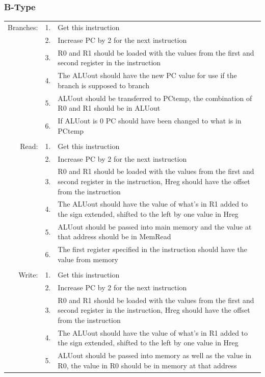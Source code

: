 \documentclass{article}
\begin{document}
		\subsubsection{B-Type}
			\begin{tabular}{ r  r  p{13cm} }
					Branches: & 1. & Get this instruction\\
					          & 2. & Increase PC by 2 for the next instruction\\
					          & 3. & R0 and R1 should be loaded with the values from the first and second register in the instruction\\
					          & 4. & The ALUout should have the new PC value for use if the branch is supposed to branch\\
					          & 5. & ALUout should be transferred to PCtemp, the combination of R0 and R1 should be in ALUout\\
					          & 6. & If ALUout is 0 PC should have been changed to what is in PCtemp\\
					          &    & \\
					Read:     & 1. & Get this instruction\\
					          & 2. & Increase PC by 2 for the next instruction\\
					          & 3. & R0 and R1 should be loaded with the values from the first and second register in the instruction, Hreg should have the offset from the instruction\\
					          & 4. & The ALUout should have the value of what's in R1 added to the sign extended, shifted to the left by one value in Hreg\\
					          & 5. & ALUout should be passed into main memory and the value at that address should be in MemRead\\
					          & 6. & The first register specified in the instruction should have the value from memory\\
					          &    & \\
					Write:    & 1. & Get this instruction\\
					          & 2. & Increase PC by 2 for the next instruction\\
					          & 3. & R0 and R1 should be loaded with the values from the first and second register in the instruction, Hreg should have the offset from the instruction\\
					          & 4. & The ALUout should have the value of what's in R1 added to the sign extended, shifted to the left by one value in Hreg\\
					          & 5. & ALUout should be passed into memory as well as the value in R0, the value in R0 should be in memory at that address
			\end{tabular}
\end{document}
